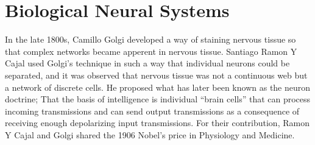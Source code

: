 
% 







\section{Biological Neural Systems}
\label{secBiologicalNeuralSystems}	
	In the late 1800s, Camillo Golgi developed a way of staining nervous tissue so that complex networks became apperent in nervous tissue.
	Santiago Ramon Y Cajal used Golgi's technique in such a way that individual neurons could be separated, and it was observed that nervous tissue was not a continuous web but a network of discrete cells. 
	He proposed what has later been known as the neuron doctrine; That the basis of intelligence is individual ``brain cells'' that can process incoming transmissions and 
		can send output transmissions as a consequence of receiving enough depolarizing input transmissions.
	For their contribution, Ramon Y Cajal and Golgi shared the 1906 Nobel's price in Physiology and Medicine.
	\cite{NeuroscienceExploringTheBrain3edKAP2}

